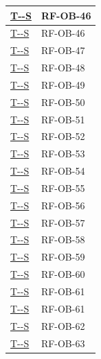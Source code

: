 \documentclass[a4paper,12pt]{article}
\newcounter{testsys}
\newcommand{\systestref}{%
  \hyperlink{T-\arabic{testsys}-S}{T-\arabic{testsys}-S}%
}
\begin{document}
\begin{longtable}{|>{\centering\arraybackslash}p{5cm}|>{\centering\arraybackslash}p{9cm}|}
\stepcounter{testsys}
\systestref & RF-OB-46 \\
\hline

\stepcounter{testsys}
\systestref & RF-OB-46 \\
\hline

\stepcounter{testsys}
\systestref & RF-OB-47 \\
\hline

\stepcounter{testsys}
\systestref & RF-OB-48 \\
\hline

\stepcounter{testsys}
\systestref & RF-OB-49 \\
\hline

\stepcounter{testsys}
\systestref & RF-OB-50 \\
\hline

\stepcounter{testsys}
\systestref & RF-OB-51 \\
\hline

\stepcounter{testsys}
\systestref & RF-OB-52 \\
\hline

\stepcounter{testsys}
\systestref & RF-OB-53 \\
\hline

\stepcounter{testsys}
\systestref & RF-OB-54 \\
\hline

\stepcounter{testsys}
\systestref & RF-OB-55 \\
\hline

\stepcounter{testsys}
\systestref & RF-OB-56 \\
\hline

\stepcounter{testsys}
\systestref & RF-OB-57 \\
\hline

\stepcounter{testsys}
\systestref & RF-OB-58 \\
\hline

\stepcounter{testsys}
\systestref & RF-OB-59 \\
\hline

\stepcounter{testsys}
\systestref & RF-OB-60 \\
\hline

\stepcounter{testsys}
\systestref & RF-OB-61 \\
\hline

\stepcounter{testsys}
\systestref & RF-OB-61 \\
\hline

\stepcounter{testsys}
\systestref & RF-OB-62 \\
\hline

\stepcounter{testsys}
\systestref & RF-OB-63 \\
\hline


\end{longtable}
\end{document}
